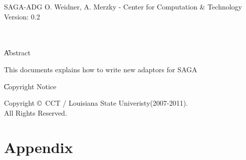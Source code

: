 
\newcommand{\sagadocument}{SAGA-ADG} 
\newcommand{\sagaversion} {0.2}
\newcommand{\sagabasename}{saga_adaptor_guide} 
\newcommand{\sagaemail}   {saga-users@cct.lsu.edu}



\sagaverb{\|}



  \thispagestyle{empty} \sagadocument{}
  		\hfill O. Weidner, A. Merzky - Center for Computation \& Technology\\
      [1em] Version: \sagaversion \hfill {\sagadate}

  \hrulefill\\

  \\

  \U{Abstract}

  This documents explains how to write new adaptors for SAGA

  \vfill


  \U{Copyright Notice}

  Copyright \copyright~CCT / Louisiana State Univeristy(2007-2011). \\ All Rights
  Reserved.\\

  \newpage \setcounter{tocdepth}{3} \tableofcontents

  \newpage


  
  \appendix
  \section*{Appendix}






